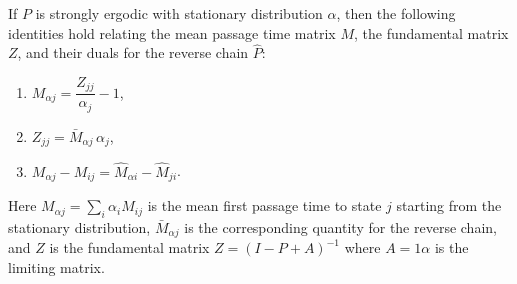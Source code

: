 If $P$ is strongly ergodic with stationary distribution $\alpha$, then the following identities hold relating the mean passage time matrix $M$, the fundamental matrix $Z$, and their duals for the reverse chain $\hat{P}$:

\begin{enumerate}
\item $M_{\alpha j} = \dfrac{Z_{jj}}{\alpha_j} - 1$,
\item $Z_{jj} = \bar{M}_{\alpha j} \, \alpha_j$,
\item $M_{\alpha j} - M_{ij} = \hat{M}_{\alpha i} - \hat{M}_{ji}$.
\end{enumerate}

Here $M_{\alpha j} = \sum_i \alpha_i M_{ij}$ is the mean first passage time to state $j$ starting from the stationary distribution, $\bar{M}_{\alpha j}$ is the corresponding quantity for the reverse chain, and $Z$ is the fundamental matrix $Z = (I - P + A)^{-1}$ where $A = 1\alpha$ is the limiting matrix.
